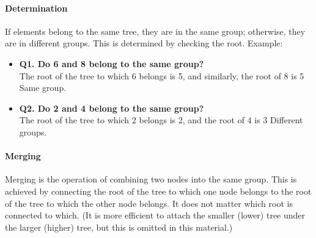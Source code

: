 \paragraph{Determination}
If elements belong to the same tree, they are in the same group; otherwise, they are in different groups.
This is determined by checking the root.
Example:
\begin{itemize}
\setlength{\itemsep}{0pt}
\item \textbf{Q1. Do 6 and 8 belong to the same group?}\\
The root of the tree to which 6 belongs is 5, and similarly, the root of 8 is 5 \dingright{} Same group.
\item \textbf{Q2. Do 2 and 4 belong to the same group?}\\
The root of the tree to which 2 belongs is 2, and the root of 4 is 3 \dingright{} Different groups.
\end{itemize}
 
\paragraph{Merging}

Merging is the operation of combining two nodes into the same group. This is achieved by connecting the root of the tree to which one node belongs to the root of the tree to which the other node belongs.
It does not matter which root is connected to which. (It is more efficient to attach the smaller (lower) tree under the larger (higher) tree, but this is omitted in this material.)

